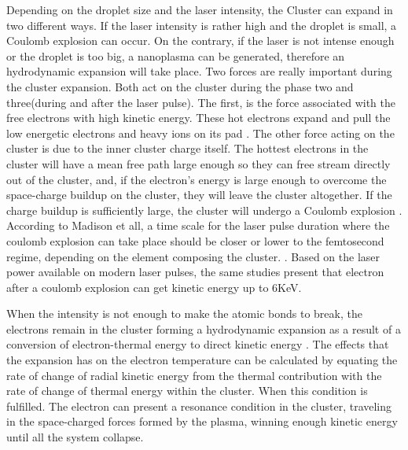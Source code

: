 Depending on the droplet size and the laser intensity, the Cluster can expand in two different ways. If the laser intensity is rather high and the droplet is small, a Coulomb explosion can occur. On the contrary, if the laser is not intense enough or the droplet is too big, a nanoplasma can be generated, therefore an hydrodynamic expansion will take place. 
Two forces are really important during the cluster expansion. Both act on the cluster during the phase two and three(during and after the laser pulse). The first, is the force associated with the free electrons with high kinetic energy. These hot electrons expand and pull the low energetic electrons and heavy ions on its pad  \cite{ditmire_interaction_1996}. The other force acting on the cluster is due to the inner cluster charge itself. The hottest electrons in the cluster will have a mean free path large enough so they can free stream directly out of the cluster, and, if the electron’s energy is large enough to overcome the space-charge buildup on the cluster, they will leave the cluster altogether. If the charge buildup is sufficiently large, the cluster will undergo a Coulomb explosion \cite{haught_formation_1970}. According to Madison et all, a time scale for the laser pulse duration  where the coulomb explosion can take place should be  closer or lower to the femtosecond regime, depending  on the element composing the cluster. \cite{madison_role_2004}. Based on the laser power available on modern laser pulses, the same studies present that electron after a coulomb explosion can get kinetic energy up to 6KeV.


When the intensity is not enough to make the atomic bonds to break, the  electrons remain in the cluster forming a  hydrodynamic expansion as a result of a conversion of electron-thermal energy to direct kinetic energy \cite{erk_nobel_2009}. The effects that the expansion has on the electron temperature can be calculated by equating the rate of change of radial kinetic energy from the thermal contribution with the rate of change of thermal energy within the cluster. When this condition is fulfilled. The electron can present a resonance condition in the cluster, traveling in the space-charged forces formed by the plasma, winning enough kinetic energy until all the system collapse.

